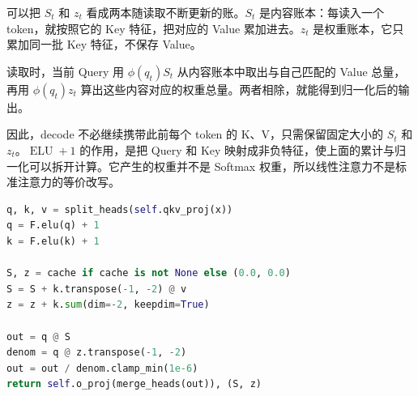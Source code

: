 可以把 $S_t$ 和 $z_t$ 看成两本随读取不断更新的账。$S_t$ 是内容账本：每读入一个 token，就按照它的 Key 特征，把对应的 Value 累加进去。$z_t$ 是权重账本，它只累加同一批 Key 特征，不保存 Value。

读取时，当前 Query 用 $\phi(q_t)S_t$ 从内容账本中取出与自己匹配的 Value 总量，再用 $\phi(q_t)z_t$ 算出这些内容对应的权重总量。两者相除，就能得到归一化后的输出。

因此，decode 不必继续携带此前每个 token 的 K、V，只需保留固定大小的 $S_t$ 和 $z_t$。$\operatorname{ELU}+1$ 的作用，是把 Query 和 Key 映射成非负特征，使上面的累计与归一化可以拆开计算。它产生的权重并不是 Softmax 权重，所以线性注意力不是标准注意力的等价改写。

\begin{lstlisting}[language=Python,caption={把历史 K、V 折叠进固定状态}]
q, k, v = split_heads(self.qkv_proj(x))
q = F.elu(q) + 1
k = F.elu(k) + 1

S, z = cache if cache is not None else (0.0, 0.0)
S = S + k.transpose(-1, -2) @ v
z = z + k.sum(dim=-2, keepdim=True)

out = q @ S
denom = q @ z.transpose(-1, -2)
out = out / denom.clamp_min(1e-6)
return self.o_proj(merge_heads(out)), (S, z)
\end{lstlisting}

